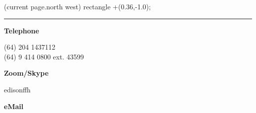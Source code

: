 \documentclass[12pt]{extarticle}
\renewcommand{\thepage}{\arabic{page}}%
\begin{document}
\pagestyle{fancy}
\fancyhf{}
\fancyhead[R]{\textcolor{gray}{\scriptsize Last update \today}} %
\fancyfoot[C]{\thepage}


\begin{minipage}{0.32\columnwidth}

  (current page.north west) rectangle +(0.36\paperwidth,-1.0\paperheight);

\vspace*{-14.25mm}
\noindent
{\color{black!75!white}\rule{1.06\linewidth}{0.15mm} }

 \vspace*{-10mm}
 \begin{flushright}

% 

  \textcolor{azul}{\bf\Large Telephone}\\ \vspace*{3mm}

    (64) 204 1437112 \\ \vspace*{-0.5mm}
    (64) 9 414 0800 ext. 43599\\ 
    \vspace*{4mm}

  \textcolor{azul}{\bf\Large Zoom/Skype}\\ \vspace*{3mm}
  
    edisonffh%
    \vspace*{4mm}
    
  \textcolor{azul}{\bf\Large eMail}\\ \vspace*{3mm}


\end{flushright}
\end{minipage}
\end{document}
